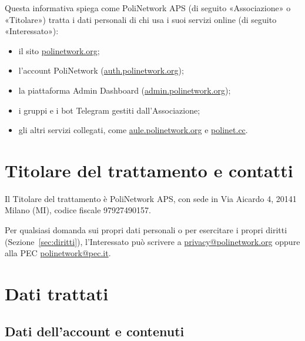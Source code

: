 \documentclass[legal]{polinetwork}
\begin{document}
\pnMakeHeader
\vspace{-16pt}
\par
\vspace{10pt}

Questa informativa spiega come PoliNetwork APS (di seguito «Associazione» o «Titolare») tratta i dati personali di chi usa i suoi servizi online (di seguito «Interessato»):
\begin{itemize}
    \item il sito \href{https://polinetwork.org}{polinetwork.org};
    \item l'account PoliNetwork (\href{https://auth.polinetwork.org}{auth.polinetwork.org});
    \item la piattaforma Admin Dashboard (\href{https://admin.polinetwork.org}{admin.polinetwork.org});
    \item i gruppi e i bot Telegram gestiti dall'Associazione;
    \item gli altri servizi collegati, come \href{https://aule.polinetwork.org}{aule.polinetwork.org} e \href{https://polinet.cc}{polinet.cc}.
\end{itemize}

\section{Titolare del trattamento e contatti}
\label{sec:titolare}

Il Titolare del trattamento è PoliNetwork APS, con sede in Via Aicardo 4, 20141 Milano (MI), codice fiscale 97927490157.

Per qualsiasi domanda sui propri dati personali o per esercitare i propri diritti (Sezione~\ref{sec:diritti}), l'Interessato può scrivere a \href{mailto:privacy@polinetwork.org}{privacy@polinetwork.org} oppure alla PEC \href{mailto:polinetwork@pec.it}{polinetwork@pec.it}.

\section{Dati trattati}
\label{sec:dati}

\subsection{Dati dell'account e contenuti}
\label{sec:dati-forniti}
\end{document}
